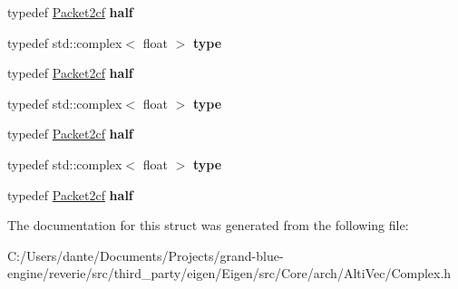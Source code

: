 \begin{DoxyCompactItemize}
typedef \mbox{\hyperlink{struct_eigen_1_1internal_1_1_packet2cf}{Packet2cf}} {\bfseries half}
\item 
\mbox{\label{struct_eigen_1_1internal_1_1unpacket__traits_3_01_packet2cf_01_4_a55870d9184e1deef0663f4d6741bc3c2}} 
typedef std\+::complex$<$ float $>$ {\bfseries type}
\item 
\mbox{\label{struct_eigen_1_1internal_1_1unpacket__traits_3_01_packet2cf_01_4_a706e6fd2e56f984265c7d4696448973d}} 
typedef \mbox{\hyperlink{struct_eigen_1_1internal_1_1_packet2cf}{Packet2cf}} {\bfseries half}
\item 
\mbox{\label{struct_eigen_1_1internal_1_1unpacket__traits_3_01_packet2cf_01_4_a55870d9184e1deef0663f4d6741bc3c2}} 
typedef std\+::complex$<$ float $>$ {\bfseries type}
\item 
\mbox{\label{struct_eigen_1_1internal_1_1unpacket__traits_3_01_packet2cf_01_4_a706e6fd2e56f984265c7d4696448973d}} 
typedef \mbox{\hyperlink{struct_eigen_1_1internal_1_1_packet2cf}{Packet2cf}} {\bfseries half}
\item 
\mbox{\label{struct_eigen_1_1internal_1_1unpacket__traits_3_01_packet2cf_01_4_a55870d9184e1deef0663f4d6741bc3c2}} 
typedef std\+::complex$<$ float $>$ {\bfseries type}
\item 
\mbox{\label{struct_eigen_1_1internal_1_1unpacket__traits_3_01_packet2cf_01_4_a706e6fd2e56f984265c7d4696448973d}} 
typedef \mbox{\hyperlink{struct_eigen_1_1internal_1_1_packet2cf}{Packet2cf}} {\bfseries half}
\end{DoxyCompactItemize}


The documentation for this struct was generated from the following file\+:\begin{DoxyCompactItemize}
\item 
C\+:/\+Users/dante/\+Documents/\+Projects/grand-\/blue-\/engine/reverie/src/third\+\_\+party/eigen/\+Eigen/src/\+Core/arch/\+Alti\+Vec/Complex.\+h\end{DoxyCompactItemize}

